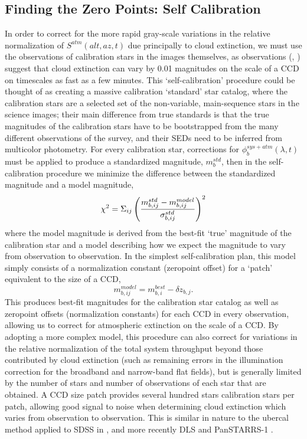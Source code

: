 \documentclass[12pt,preprint]{aastex}
\begin{document}
\subsection{Finding the Zero Points: Self Calibration}
In order to correct for the more rapid gray-scale variations in the
relative normalization of $S^{atm}(alt,az,t)$ due principally to cloud extinction,
we must use the observations of calibration stars in the images themselves, as
 observations (\citep{Burke13}, \citep{Ivezic2007}) suggest that cloud extinction can vary by 0.01 magnitudes on the scale of a CCD
on timescales as fast as a few minutes. This
`self-calibration' procedure could be thought of as creating a massive
calibration `standard' star catalog, where the calibration stars are
a selected set of the non-variable, main-sequence stars in the science images;
their main difference from true standards is that the true magnitudes of the calibration
stars have to be bootstrapped from the many different observations of
the survey, and their SEDs need to be inferred from multicolor photometry.
For every calibration star, corrections for
 $\phi_b^{sys+atm}(\lambda,t)$ must be
applied to produce a standardized magnitude, $m_b^{std}$, then in the
self-calibration procedure we minimize the difference between the
standardized magnitude and a model magnitude,
\begin{equation}
\label{eqn:chi2}
\chi^2 = \Sigma_{ij} \left( { m_{b,ij}^{std} - m_{b,ij}^{model} \over
\sigma_{b,ij}^{std} } \right)^2
\end{equation}
where the model magnitude is derived from the best-fit `true'
magnitude of the calibration star and a model describing how we expect
the magnitude to vary from observation to observation. In the simplest
self-calibration plan, this model simply consists of a normalization constant
(zeropoint offset) for a `patch' equivalent to the size of a CCD,
\begin{equation}
\label{eqn:modelmag}
m_{b,ij}^{model} = m_{b,i}^{best} - \delta z_{b,j}.
\end{equation}
This produces best-fit magnitudes for the calibration star catalog as
well as zeropoint offsets (normalization constants) for each CCD in
every observation, allowing us to correct for atmospheric extinction
on the scale of a CCD. By adopting a more complex model, this
procedure can also correct for variations in the relative
normalization of the total system throughput beyond those contributed
by cloud extinction (such as remaining errors in the illumination
correction for the broadband and narrow-band flat fields), but is
generally limited by the number of stars and number of observations of
each star that are obtained. A CCD size patch provides several hundred stars
calibration stars per patch, allowing good signal to noise when determining cloud
extinction which varies from observation to observation.
This is similar in
nature to the ubercal method applied to SDSS in
\citet{Padmanabhan2008}, and more recently DLS \citep{Wittman2012} and PanSTARRS-1 \citep{Schlafly2012}.
\end{document}
